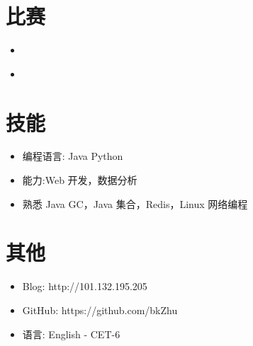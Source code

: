 \documentclass{resume}
\begin{document}
\section{\textbf{比赛} }
\begin{itemize}[parsep=0.0ex]
\item{}
\end{itemize}

\begin{itemize}[parsep=0.0ex]
\item{}
\end{itemize}


\section{\textbf{技能}}
\begin{itemize}[parsep=0.5ex]
  \item 编程语言: Java  Python 
  \item 能力:Web 开发，数据分析
  \item 熟悉 Java GC，Java 集合，Redis，Linux 网络编程
\end{itemize}


\section{\textbf{其他} }
\begin{itemize}[parsep=0.5ex]
  \item Blog: http://101.132.195.205
  \item GitHub: https://github.com/bkZhu
  \item 语言: English - CET-6
\end{itemize}
\end{document}
